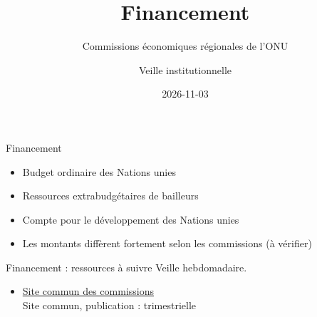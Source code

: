 \documentclass[aspectratio=169,11pt]{beamer}
\title{Financement}
\subtitle{Commissions économiques régionales de l'ONU}
\author{Veille institutionnelle}
\date{2026-11-03}
\begin{document}
\begin{frame}\titlepage\end{frame}

\begin{frame}{Financement}
\begin{itemize}
\item Budget ordinaire des Nations unies
\item Ressources extrabudgétaires de bailleurs
\item Compte pour le développement des Nations unies
\item Les montants diffèrent fortement selon les commissions (à vérifier)
\end{itemize}
\end{frame}

\begin{frame}{Financement : ressources à suivre}
\small
Veille hebdomadaire.
\begin{itemize}
\item \href{https://www.regionalcommissions.org}{Site commun des commissions}\\{\footnotesize Site commun, publication : trimestrielle}
\end{itemize}
\end{frame}
\end{document}
